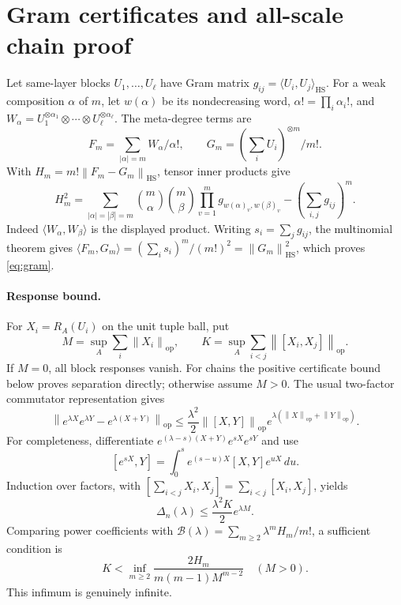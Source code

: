 \documentclass[11pt,a4paper]{article}
\newcommand{\HS}{\mathrm{HS}}
\newcommand{\op}{\mathrm{op}}
\newcommand{\B}{\mathcal B}
\newcommand{\Del}{\Delta}
\newcommand{\norm}[1]{\left\lVert#1\right\rVert}
\begin{document}
\section{Gram certificates and all-scale chain proof}\label{app:chain}
Let same-layer blocks \(U_1,\ldots,U_\ell\) have Gram matrix
\(g_{ij}=\langle U_i,U_j\rangle_{\HS}\).
For a weak composition \(\alpha\) of \(m\), let \(w(\alpha)\) be its
nondecreasing word, \(\alpha!=\prod_i\alpha_i!\), and
\(W_\alpha=U_1^{\otimes\alpha_1}\otimes\cdots\otimes U_\ell^{\otimes\alpha_\ell}\).
The meta-degree terms are
\[
 F_m=\sum_{|\alpha|=m}W_\alpha/\alpha!,
 \qquad G_m=(\sum_iU_i)^{\otimes m}/m!.
\]
With \(H_m=m!\norm{F_m-G_m}_{\HS}\), tensor inner products give
\begin{equation}\label{eq:gram}
 H_m^2=\sum_{|\alpha|=|\beta|=m}
 \binom m\alpha\binom m\beta
 \prod_{v=1}^m g_{w(\alpha)_v,w(\beta)_v}
 -\left(\sum_{i,j}g_{ij}\right)^m.
\end{equation}
Indeed \(\langle W_\alpha,W_\beta\rangle\) is the displayed product.
Writing \(s_i=\sum_jg_{ij}\), the multinomial theorem gives
\(\langle F_m,G_m\rangle=(\sum_i s_i)^m/(m!)^2=\norm{G_m}_{\HS}^2\),
which proves \eqref{eq:gram}.

\paragraph{Response bound.}
For \(X_i=R_A(U_i)\) on the unit tuple ball, put
\[
 M=\sup_A\sum_i\norm{X_i}_{\op},\qquad
 K=\sup_A\sum_{i<j}\norm{[X_i,X_j]}_{\op}.
\]
If \(M=0\), all block responses vanish. For chains the positive certificate
bound below proves separation directly; otherwise assume \(M>0\).
The usual two-factor commutator representation \cite{iserles2024elementary}
gives
\[
 \norm{e^{\lambda X}e^{\lambda Y}-e^{\lambda(X+Y)}}_{\op}
 \le\frac{\lambda^2}{2}\norm{[X,Y]}_{\op}
             e^{\lambda(\norm{X}_{\op}+\norm{Y}_{\op})}.
\]
For completeness, differentiate
\(e^{(\lambda-s)(X+Y)}e^{sX}e^{sY}\) and use
\[
 [e^{sX},Y]=\int_0^s e^{(s-u)X}[X,Y]e^{uX}\,du.
\]
Induction over factors, with
\([\sum_{i<j}X_i,X_j]=\sum_{i<j}[X_i,X_j]\), yields
\[
 \Del_n(\lambda)\le\frac{\lambda^2K}{2}e^{\lambda M}.
\]
Comparing power coefficients with
\(\B(\lambda)=\sum_{m\ge2}\lambda^mH_m/m!\), a sufficient condition is
\[
 K<\inf_{m\ge2}\frac{2H_m}{m(m-1)M^{m-2}}\quad(M>0).
\]
This infimum is genuinely infinite.
\end{document}

